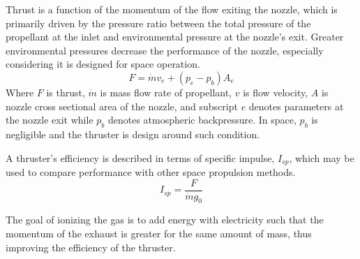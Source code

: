\documentclass[conference]{IEEEtran}
\begin{document}

Thrust is a function of the momentum of the flow exiting the nozzle, which is primarily driven by the pressure ratio between the total pressure of the propellant at the inlet and environmental pressure at the nozzle's exit.
Greater environmental pressures decrease the performance of the nozzle, especially considering it is designed for space operation.
\begin{equation}
\label{eq:thrust}
  F=\dot{m}v_e + (p_e-p_b)A_e
\end{equation}
 Where $F$ is thrust, $\dot{m}$ is mass flow rate of propellant, $v$ is flow velocity, $A$ is nozzle cross sectional area of the nozzle, and subscript $e$ denotes parameters at the nozzle exit while $p_b$ denotes atmospheric backpressure.
 In space, $p_b$ is negligible and the thruster is design around such condition.

 A thruster's efficiency is described in terms of specific impulse, $I_{sp}$, which may be used to compare performance with other space propulsion methods.
 \begin{equation}
 \label{eq:isp}
   I_{sp}=\frac{F}{\dot{m} g_0}
 \end{equation}

The goal of ionizing the gas is to add energy with electricity such that the momentum of the exhaust is greater for the same amount of mass, thus improving the efficiency of the thruster.

\end{document}
